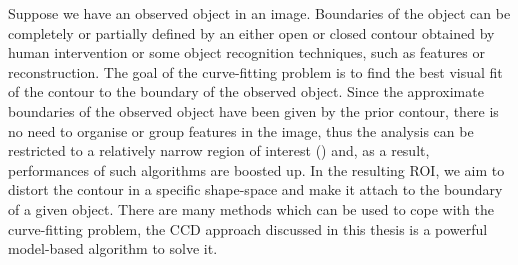 Suppose we have an observed object in an
image. Boundaries of the object can be completely or partially defined
by an either open or closed contour obtained by human intervention or
some object recognition techniques, such as  features or reconstruction. The goal of
the curve-fitting problem is to find the best visual fit of the contour to the boundary of
the observed object. Since the approximate boundaries of the observed
object have been given by the prior contour, there is no need to organise or group features in the
image, thus the analysis can be restricted to a relatively narrow
region of interest () and, as a result, performances of such algorithms
are boosted up. In the resulting ROI, we aim to distort the contour in a specific
shape-space and make it attach to the boundary of a given
object. There are many methods which can be used to cope with the
curve-fitting problem, the CCD approach discussed in this
thesis is a powerful model-based algorithm to solve it.

